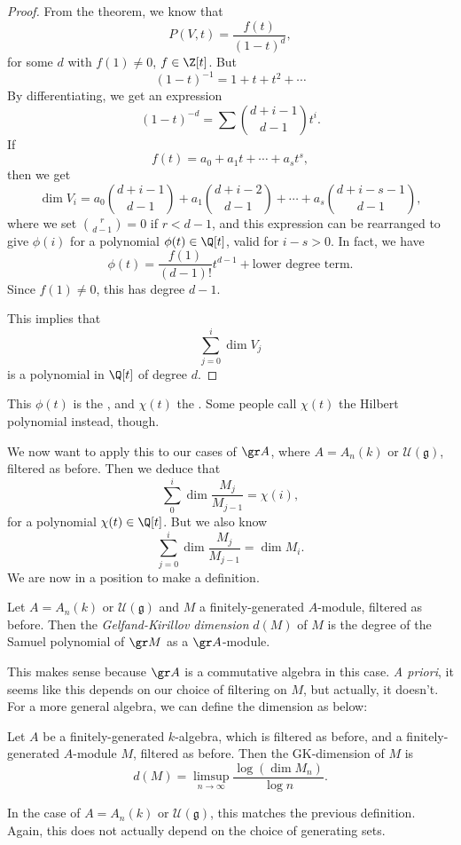 \documentclass[a4paper]{article}
\newcommand\GKdim{\mathrm{GK}\mdash\mathrm{dim}}
\begin{document}
\begin{proof}
  From the theorem, we know that
  \[
    P(V, t) = \frac{f(t)}{(1 - t)^d},
  \]
  for some $d$ with $f(1) \not= 0$, $f \in \Z[t]$. But
  \[
    (1 - t)^{-1} = 1 + t + t^2 + \cdots
  \]
  By differentiating, we get an expression
  \[
    (1 - t)^{-d} = \sum \binom{d + i - 1}{d - 1} t^i.
  \]
  If
  \[
    f(t) = a_0 + a_1 t + \cdots + a_s t^s,
  \]
  then we get
  \[
    \dim V_i = a_0 \binom{d + i - 1}{d - 1} + a_1 \binom{d + i - 2}{d - 1} + \cdots + a_s \binom{d + i - s- 1}{d - 1},
  \]
  where we set $\binom{r}{d - 1} = 0$ if $r < d - 1$, and this expression can be rearranged to give $\phi(i)$ for a polynomial $\phi(t) \in \Q[t]$, valid for $i - s > 0$. In fact, we have
  \[
    \phi(t) = \frac{f(1)}{(d - 1)!} t^{d - 1} + \text{lower degree term}.
  \]
  Since $f(1) \not= 0$, this has degree $d - 1$.

  This implies that
  \[
    \sum_{j = 0}^i \dim V_j
  \]
  is a polynomial in $\Q[t]$ of degree $d$.
\end{proof}
This $\phi(t)$ is the , and $\chi(t)$ the . Some people call $\chi(t)$ the Hilbert polynomial instead, though.

We now want to apply this to our cases of $\gr A$, where $A = A_n(k)$ or $\mathcal{U}(\mathfrak{g})$, filtered as before. Then we deduce that
\[
  \sum_0^i \dim \frac{M_j}{M_{j - 1}} = \chi(i),
\]
for a polynomial $\chi(t) \in \Q[t]$. But we also know
\[
  \sum_{j = 0}^i \dim \frac{M_j}{M_{j - 1}} = \dim M_i.
\]
We are now in a position to make a definition.
\begin{defi}\index{$\GKdim(M)$}
  Let $A = A_n(k)$ or $\mathcal{U}(\mathfrak{g})$ and $M$ a finitely-generated $A$-module, filtered as before. Then the \emph{Gelfand-Kirillov dimension} $d(M)$ of $M$ is the degree of the Samuel polynomial of $\gr M$ as a $\gr A$-module.
\end{defi}
This makes sense because $\gr A$ is a commutative algebra in this case. \emph{A priori}, it seems like this depends on our choice of filtering on $M$, but actually, it doesn't. For a more general algebra, we can define the dimension as below:

\begin{defi}\index{$\GKdim(M)$}
  Let $A$ be a finitely-generated $k$-algebra, which is filtered as before, and a finitely-generated $A$-module $M$, filtered as before. Then the GK-dimension of $M$ is
  \[
    d(M) = \limsup_{n \to \infty} \frac{\log (\dim M_n)}{\log n}.
  \]
\end{defi}
In the case of $A = A_n(k)$ or $\mathcal{U}(\mathfrak{g})$, this matches the previous definition. Again, this does not actually depend on the choice of generating sets.
\end{document}
